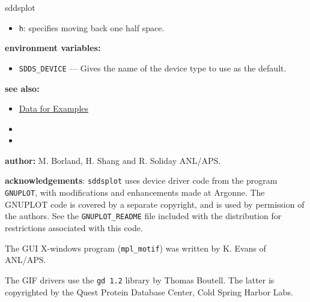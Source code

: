 \begin{sddsprog}{sddsplot}
\begin{itemize}
\item {\tt h}: specifies moving back one half space.
\end{itemize}


  \item \textbf{environment variables:}
        \begin{itemize}
        \item {\tt SDDS\_DEVICE} --- Gives the name of the device type to use as the default.
        \end{itemize}
  \item \textbf{see also:}
    \begin{itemize}
    \item \hyperref[exampleData]{Data for Examples}
    \item {}
    \item {}
    \end{itemize}
  \item \textbf{author:} M. Borland, H. Shang and R. Soliday ANL/APS.

  \item \textbf{acknowledgements}: \verb|sddsplot| uses device driver code from the program {\tt GNUPLOT},
with modifications and enhancements made at Argonne.  The GNUPLOT code is covered by a separate
copyright, and is used by permission of the authors.  See the {\tt GNUPLOT\_README} file included
with the distribution for restrictions associated with this code.

The GUI X-windows program ({\tt mpl\_motif}) was written by K. Evans of ANL/APS.

The GIF drivers use the {\tt gd 1.2} library by Thomas Boutell.  The latter is copyrighted by the
Quest Protein Database Center, Cold Spring Harbor Labs.

\end{sddsprog}


